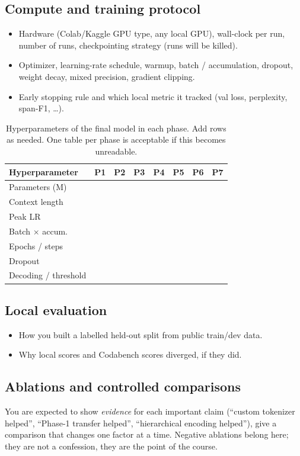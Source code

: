 \documentclass[11pt, oneside]{article}
\begin{document}
\subsection{Compute and training protocol}
\begin{itemize}[leftmargin=*]
    \item Hardware (Colab/Kaggle GPU type, any local GPU), wall-clock per run, number of runs, checkpointing strategy (runs will be killed).
    \item Optimizer, learning-rate schedule, warmup, batch / accumulation, dropout, weight decay, mixed precision, gradient clipping.
    \item Early stopping rule and which local metric it tracked (val loss, perplexity, span-F1, \ldots).
\end{itemize}
\begin{table}[H]
\centering
\caption{Hyperparameters of the final model in each phase. Add rows as needed. One table per phase is acceptable if this becomes unreadable.}
\label{tab:hparams}
\begin{tabular}{lccccccc}
\toprule
Hyperparameter & P1 & P2 & P3 & P4 & P5 & P6 & P7 \\
\midrule
Parameters (M) &  &  &  &  &  &  &  \\
Context length &  &  &  &  &  &  &  \\
Peak LR &  &  &  &  &  &  &  \\
Batch $\times$ accum. &  &  &  &  &  &  &  \\
Epochs / steps &  &  &  &  &  &  &  \\
Dropout &  &  &  &  &  &  &  \\
Decoding / threshold &  &  &  &  &  &  &  \\
\bottomrule
\end{tabular}
\end{table}
\subsection{Local evaluation}
\begin{itemize}[leftmargin=*]
    \item How you built a labelled held-out split from public train/dev data.
    \item Why local scores and Codabench scores diverged, if they did.
\end{itemize}
\subsection{Ablations and controlled comparisons}
You are expected to show \emph{evidence} for each important claim (``custom tokenizer helped'', ``Phase-1 transfer helped'', ``hierarchical encoding helped''), give a comparison that changes one factor at a time. Negative ablations belong here; they are not a confession, they are the point of the course.
\end{document}
